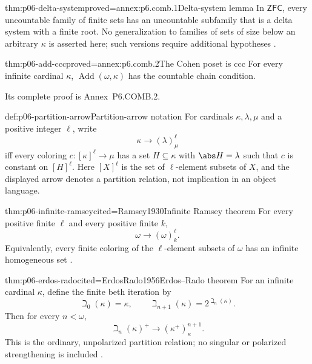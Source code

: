 \begin{hbtheorem}{thm:p06-delta-system}{proved=annex:p6.comb.1}{Delta-system lemma}
In \(\mathsf{ZFC}\), every uncountable family of finite sets has an
uncountable subfamily that is a delta system with a finite root.  No
generalization to families of sets of size below an arbitrary \(\kappa\) is
asserted here; such versions require additional hypotheses
\cite{Shanin1946,Jech2003}.
\end{hbtheorem}

\begin{hblemma}{thm:p06-add-ccc}{proved=annex:p6.comb.2}{The Cohen poset is ccc}
For every infinite cardinal \(\kappa\),
\(\operatorname{Add}(\omega,\kappa)\) has the countable chain condition.
\end{hblemma}

Its complete proof is
Annex~P6.COMB.2.

\begin{hbdefinition}{def:p06-partition-arrow}{Partition-arrow notation}
For cardinals \(\kappa,\lambda,\mu\) and a positive integer \(\ell\), write
\[
  \kappa\longrightarrow(\lambda)^\ell_\mu
\]
iff every coloring \(c:[\kappa]^\ell\to\mu\) has a set
\(H\subseteq\kappa\) with \(\abs H=\lambda\) such that \(c\) is constant on
\([H]^\ell\).  Here \([X]^\ell\) is the set of \(\ell\)-element subsets of \(X\),
and the displayed arrow denotes a partition relation, not implication in an
object language.
\end{hbdefinition}

\begin{hbtheorem}{thm:p06-infinite-ramsey}{cited=Ramsey1930}{Infinite Ramsey theorem}
For every positive finite \(\ell\) and every positive finite \(k\),
\[
  \omega\longrightarrow(\omega)^\ell_k.
\]
Equivalently, every finite coloring of the \(\ell\)-element subsets of
\(\omega\) has an infinite homogeneous set \cite{Ramsey1930}.
\end{hbtheorem}

\begin{hbtheorem}{thm:p06-erdos-rado}{cited=ErdosRado1956}{Erdos--Rado theorem}
For an infinite cardinal \(\kappa\), define the finite beth iteration by
\[
  \beth_0(\kappa)=\kappa,
  \qquad
  \beth_{n+1}(\kappa)=2^{\beth_n(\kappa)}.
\]
Then for every \(n<\omega\),
\[
  \beth_n(\kappa)^+
  \longrightarrow
  (\kappa^+)^{n+1}_\kappa.
\]
This is the ordinary, unpolarized partition relation; no singular or
polarized strengthening is included \cite{ErdosRado1956}.
\end{hbtheorem}

